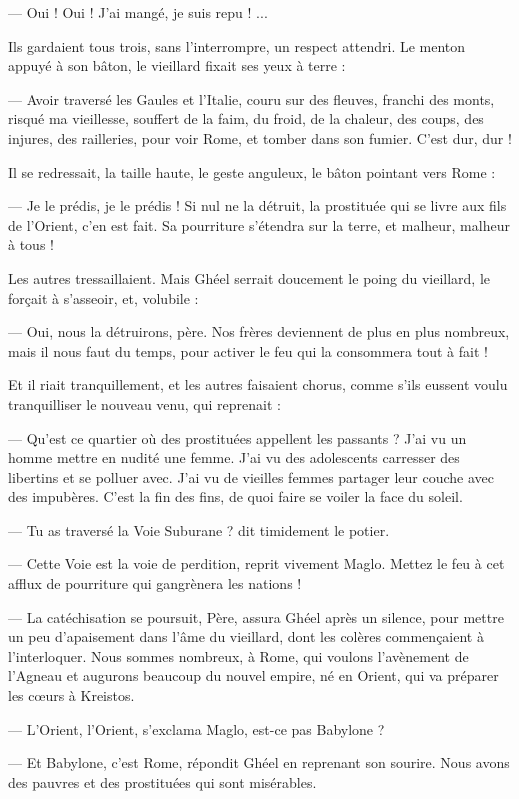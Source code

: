 \documentclass[a4paper, 11pt, oneside, polutonikogreek, french]{article}
\begin{document}
--- Oui ! Oui ! J'ai mangé, je suis repu ! ...

Ils gardaient tous trois, sans l'interrompre, un respect attendri. Le menton appuyé à son bâton, le vieillard fixait ses yeux à terre :

--- Avoir traversé les Gaules et l'Italie, couru sur des fleuves, franchi des monts, risqué ma vieillesse, souffert de la faim, du froid, de la chaleur, des coups, des injures, des railleries, pour voir Rome, et tomber dans son fumier. C'est dur, dur !

Il se redressait, la taille haute, le geste anguleux, le bâton pointant vers Rome :

--- Je le prédis, je le prédis ! Si nul ne la détruit, la prostituée qui se livre aux fils de l'Orient, c'en est fait. Sa pourriture s'étendra sur la terre, et malheur, malheur à tous !

Les autres tressaillaient. Mais Ghéel serrait doucement le poing du vieillard, le forçait à s'asseoir, et, volubile :

--- Oui, nous la détruirons, père. Nos frères deviennent de plus en plus nombreux, mais il nous faut du temps, pour activer le feu qui la consommera tout à fait !

Et il riait tranquillement, et les autres faisaient chorus, comme s'ils eussent voulu tranquilliser le nouveau venu, qui reprenait :

--- Qu'est ce quartier où des prostituées appellent les passants ? J'ai vu un homme mettre en nudité une femme. J'ai vu des adolescents carresser des libertins et se polluer avec. J'ai vu de vieilles femmes partager leur couche avec des impubères. C'est la fin des fins, de quoi faire se voiler la face du soleil.

--- Tu as traversé la Voie Suburane ? dit timidement le potier.

--- Cette Voie est la voie de perdition, reprit vivement Maglo. Mettez le feu à cet afflux de pourriture qui gangrènera les nations !

--- La catéchisation se poursuit, Père, assura Ghéel après un silence, pour mettre un peu d'apaisement dans l'âme du vieillard, dont les colères commençaient à l'interloquer. Nous sommes nombreux, à Rome, qui voulons l'avènement de l'Agneau et augurons beaucoup du nouvel empire, né en Orient, qui va préparer les cœurs à Kreistos.

--- L'Orient, l'Orient, s'exclama Maglo, est-ce pas Babylone ?

--- Et Babylone, c'est Rome, répondit Ghéel en reprenant son sourire. Nous avons des pauvres et des prostituées qui sont misérables.
\end{document}
